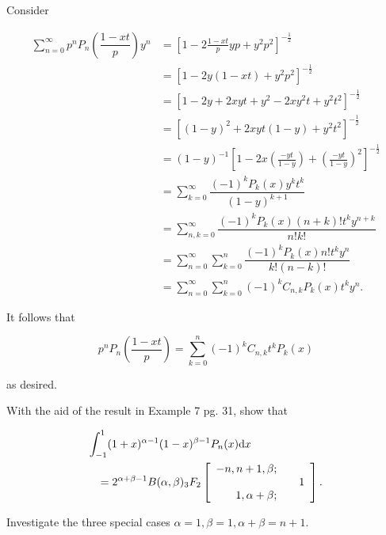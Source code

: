 \begin{solution}
Consider

$$\begin{array}{ll}
\displaystyle\sum_{n=0}^{\infty} p^n P_n \left( \dfrac{1-xt}{p} \right)y^n &= [1-2 \frac{1-xt}{p} yp + y^2p^2]^{-\frac{1}{2}} \\
&= [1-2y(1-xt)+y^2p^2]^{-\frac{1}{2}} \\
&= [1-2y+2xyt+y^2-2xy^2t+y^2t^2]^{-\frac{1}{2}} \\
&= [(1-y)^2+2xyt(1-y)+y^2t^2]^{-\frac{1}{2}} \\
&= (1-y)^{-1} [1 - 2x (\frac{-yt}{1-y}) + (\frac{-yt}{1-y})^2]^{-\frac{1}{2}} \\
&= \displaystyle\sum_{k=0}^{\infty} \dfrac{(-1)^k P_k(x) y^kt^k}{(1-y)^{k+1}} \\
&= \displaystyle\sum_{n,k=0}^{\infty} \dfrac{(-1)^k P_k(x) (n+k)! t^k y^{n+k}}{n! k!} \\
&= \displaystyle\sum_{n=0}^{\infty} \displaystyle\sum_{k=0}^n \dfrac{(-1)^k P_k(x) n! t^k y^n}{k! (n-k)!} \\
&= \displaystyle\sum_{n=0}^{\infty} \displaystyle\sum_{k=0}^n (-1)^k C_{n,k} P_k(x)t^k y^n.
\end{array}$$

It follows that

$$p^n P_n \left( \dfrac{1-xt}{p} \right) = \displaystyle\sum_{k=0}^n (-1)^k C_{n,k} t^k P_k(x)$$

as desired.
\end{solution}
\begin{problem}\label{problem10chapter10}
With the aid of the result in Example 7 pg. 31, show that

\begin{eqnarray*}
\lefteqn{\displaystyle\int_{-1}^1 (1+x)^{\alpha-1}(1-x)^{\beta-1} P_n(x) \mathrm{d}x} \\
& & = 2^{\alpha + \beta -1}B(\alpha, \beta) {}_3F_2 \left[ \begin{array}{rlr}
-n, n+1, \beta; & & \\
& & 1 \\
1, \alpha + \beta; & & 
\end{array} \right].
\end{eqnarray*}

Investigate the three special cases $\alpha=1, \beta=1, \alpha+\beta=n+1$.
\end{problem}
